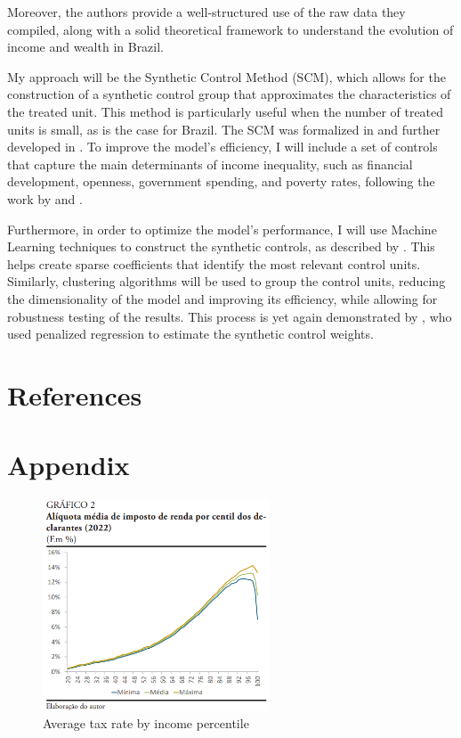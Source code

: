 \documentclass[a4paper, 12pt]{article}
\begin{document}
Moreover, the authors provide a well-structured use of the raw data they compiled, along with a solid theoretical framework to understand the evolution of income and wealth in Brazil.
\par    
My approach will be the Synthetic Control Method (SCM), which allows for the construction of a synthetic control group that approximates the characteristics of the treated unit.
This method is particularly useful when the number of treated units is small, as is the case for Brazil.
The SCM was formalized in \cite{abadie2003economic} and further developed in \cite{abadie2010synthetic}.
To improve the model’s efficiency, I will include a set of controls that capture the main determinants of income inequality, such as financial development, openness, government spending, and poverty rates, following the work by \cite{afandi2017determinants} and \cite{roine2009long}.
\pagebreak
\par
Furthermore, in order to optimize the model’s performance, I will use Machine Learning techniques to construct the synthetic controls, as described by \cite{araujo2023synthetic}.
This helps create sparse coefficients that identify the most relevant control units.
Similarly, clustering algorithms will be used to group the control units, reducing the dimensionality of the model and improving its efficiency, while allowing for robustness testing of the results.
This process is yet again demonstrated by \cite{abadie2023penalized}, who used penalized regression to estimate the synthetic control weights.

\newpage

\section*{References}

\printbibliography[heading=none]
\newpage

\section*{Appendix}

\begin{figure}[H]
    \centering
    \includegraphics[width=0.6\textwidth]{aliquota.png}
    \caption{Average tax rate by income percentile}
    \label{tab:Figure 1}
\end{figure}
\end{document}
